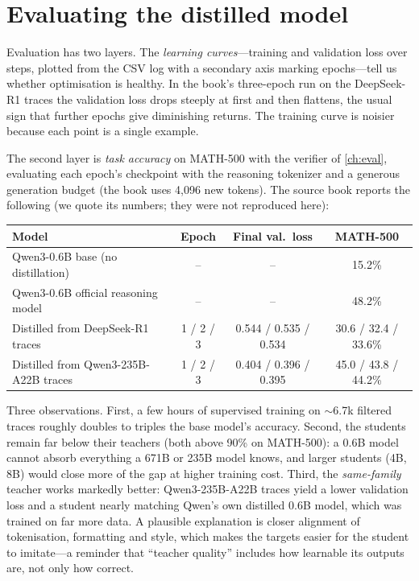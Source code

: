 \section{Evaluating the distilled model}\label{sec:distill:eval}

Evaluation has two layers. The \emph{learning curves}---training and validation loss over steps,
plotted from the CSV log with a secondary axis marking epochs---tell us whether optimisation is
healthy. In the book's three-epoch run on the DeepSeek-R1 traces the validation loss drops
steeply at first and then flattens, the usual sign that further epochs give diminishing
returns. The training curve is noisier because each point is a single example.

The second layer is \emph{task accuracy} on MATH-500 with the verifier of \cref{ch:eval},
evaluating each epoch's checkpoint with the reasoning tokenizer and a generous generation budget
(the book uses 4{,}096 new tokens). The source book reports the following (we quote its numbers;
they were not reproduced here):
\begin{center}\small
\begin{tabular}{@{}lccc@{}}
\toprule
Model & Epoch & Final val.\ loss & MATH-500\\
\midrule
Qwen3-0.6B base (no distillation) & -- & -- & 15.2\%\\
Qwen3-0.6B official reasoning model & -- & -- & 48.2\%\\
Distilled from DeepSeek-R1 traces & 1 / 2 / 3 & 0.544 / 0.535 / 0.534 & 30.6 / 32.4 / 33.6\%\\
Distilled from Qwen3-235B-A22B traces & 1 / 2 / 3 & 0.404 / 0.396 / 0.395 & 45.0 / 43.8 / 44.2\%\\
\bottomrule
\end{tabular}
\end{center}

Three observations. First, a few hours of supervised training on $\sim$6.7k filtered traces
roughly doubles to triples the base model's accuracy. Second, the students remain far below
their teachers (both above 90\% on MATH-500): a 0.6B model cannot absorb everything a 671B or
235B model knows, and larger students (4B, 8B) would close more of the gap at higher training
cost. Third, the \emph{same-family} teacher works markedly better: Qwen3-235B-A22B traces yield a
lower validation loss and a student nearly matching Qwen's own distilled 0.6B model, which was
trained on far more data. A plausible explanation is closer alignment of tokenisation, formatting
and style, which makes the targets easier for the student to imitate---a reminder that ``teacher
quality'' includes how learnable its outputs are, not only how correct.

